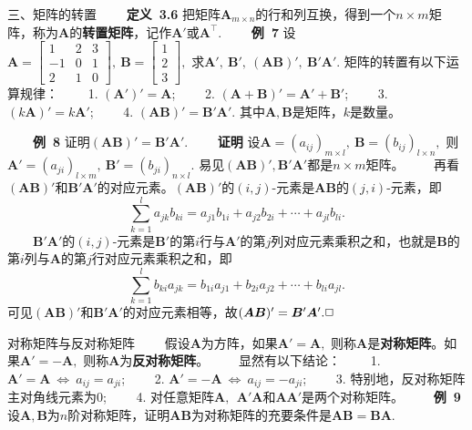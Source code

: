 \documentclass[compress,mathserif,cjk]{beamer}
\theoremstyle{remark}
\numberwithin{equation}{section}
\newcommand{\hei}{\bf}      %
\begin{document}
\begin{CJK}{UTF8}{gbsn}
\begin{frame}
\end{frame}

\begin{frame}{三、矩阵的转置}
 \ \ \ \ {\hei 定义~3.6} 把矩阵$\bm A_{m\times n}$的行和列互换，得到一个$n\times m$矩阵，称为$\bm A$的{\hei 转置矩阵}，记作$\bm A'$或$\bm A^\top$.
 \pause\vskip 10pt
 \ \ \ \ {\hei 例~7} 设$\bm A=\left[\begin{matrix}1&2&3\\-1&0&1\\2&1&0\end{matrix}\right],~\bm B=\left[\begin{matrix}1\\2\\3\end{matrix}\right],$ 求$\bm A',~\bm B',~(\bm{AB})',~\bm B'\bm A'.$
 \pause\vskip 10pt
 矩阵的转置有以下运算规律：
 \vskip 5pt
 \ \ \ \ 1. $(\bm A')'=\bm A$;
 \vskip 5pt
 \ \ \ \ 2. $(\bm A+\bm B)'=\bm A'+\bm B'$;
 \vskip 5pt
 \ \ \ \ 3. $(k\bm A)'=k\bm A'$;
 \vskip 5pt
 \ \ \ \ 4. $(\bm{AB})'=\bm B'\bm A'$.
 \vskip 5pt
 其中$\bm A,\bm B$是矩阵，$k$是数量。
\end{frame}

\begin{frame}
 \ \ \ \ {\hei 例~8} 证明$(\bm{AB})'=\bm B'\bm A'$.
 \pause\vskip 5pt
 \ \ \ \ {\hei 证明} 设$\bm A=(a_{ij})_{m\times l},~\bm B=(b_{ij})_{l\times n},$ 则$\bm A'=(a_{ji})_{l\times m},~\bm B'=(b_{ji})_{n\times l}.$ 易见$(\bm{AB})',\bm B'\bm A'$都是$n\times m$矩阵。
 \pause\vskip 5pt
 \ \ \ \ 再看$(\bm{AB})'$和$\bm B'\bm A'$的对应元素。$(\bm{AB})'$的$(i,j)$-元素是$\bm{AB}$的$(j,i)$-元素，即
 $$\sum_{k=1}^la_{jk}b_{ki}=a_{j1}b_{1i}+a_{j2}b_{2i}+\cdots+a_{jl}b_{li}.$$
 \pause\ \ \ \ $\bm B'\bm A'$的$(i,j)$-元素是$\bm B'$的第$i$行与$\bm A'$的第$j$列对应元素乘积之和，也就是$\bm B$的第$i$列与$\bm A$的第$j$行对应元素乘积之和，即
 $$\sum_{k=1}^lb_{ki}a_{jk}=b_{1i}a_{j1}+b_{2i}a_{j2}+\cdots+b_{li}a_{jl}.$$
 可见$(\bm{AB})'$和$\bm B'\bm A'$的对应元素相等，故$(\bm{AB})'=\bm B'\bm A'.\hfill\Box$
\end{frame}

\begin{frame}{对称矩阵与反对称矩阵}
 \ \ \ \ 假设$\bm A$为方阵，如果$\bm A'=\bm A,$ 则称$\bm A$是{\hei 对称矩阵}。如果$\bm A'=-\bm A,$ 则称$\bm A$为{\hei 反对称矩阵}。
 \pause\vskip 10pt
 \ \ \ \ 显然有以下结论：
 \vskip 5pt
 \ \ \ \ 1. $\bm A'=\bm A~\Longleftrightarrow~a_{ij}=a_{ji}$;
 \vskip 5pt
 \ \ \ \ 2. $\bm A'=-\bm A~\Longleftrightarrow~a_{ij}=-a_{ji}$;
 \vskip 5pt
 \ \ \ \ 3. 特别地，反对称矩阵主对角线元素为0;
 \vskip 5pt
 \ \ \ \ 4. 对任意矩阵$\bm A,~~\bm A'\bm A$和$\bm A\bm A'$是两个对称矩阵。
 \pause\vskip 10pt
 \ \ \ \ {\hei 例~9} 设$\bm A,\bm B$为$n$阶对称矩阵，证明$\bm A\bm B$为对称矩阵的充要条件是$\bm A\bm B=\bm B\bm A$.
\end{frame}


\end{CJK}
\end{document}
